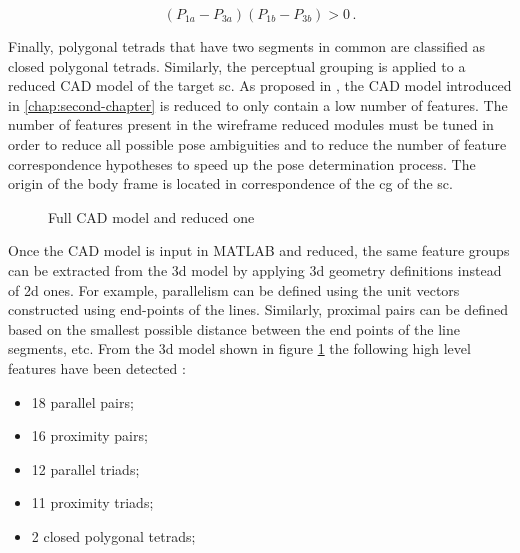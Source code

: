\begin{equation}
(P_{1a} - P_{3a})(P_{1b}-P_{3b}) > 0 \,.
\end{equation}

Finally, polygonal tetrads that have two segments in common are classified as closed polygonal tetrads.
Similarly, the perceptual grouping is applied to a reduced CAD model of the target \acrshort{sc}. As proposed in \cite{Sharma2018}, the CAD model introduced in \ref{chap:second-chapter} is reduced to only contain a low number of features. The number of features present in the wireframe reduced modules must be tuned in order to reduce all possible pose ambiguities and to reduce the number of feature correspondence hypotheses to speed up the pose determination process. The origin of the body frame is located in correspondence of the \acrshort{cg} of the \acrshort{sc}.

\begin{figure}[htbp]
  \centering
  \qquad
  \qquad
  \caption{Full CAD model and reduced one}
  \label{fig:cadModel}
\end{figure}

Once the CAD model is input in MATLAB and reduced, the same feature groups can be extracted from the \acrshort{3d} model by applying \acrshort{3d} geometry definitions instead of \acrshort{2d} ones. For example, parallelism can be defined using the unit vectors constructed using end-points of the lines. Similarly, proximal pairs can be defined based on the smallest possible distance between the end points of the line segments, etc.
From the \acrshort{3d} model shown in figure \ref{fig:cadModel} the following high level features have been detected :

\begin{itemize}
\item 18 parallel pairs;
\item 16 proximity pairs;
\item 12 parallel triads;
\item 11 proximity triads;
\item 2 closed polygonal tetrads;
\end{itemize}

